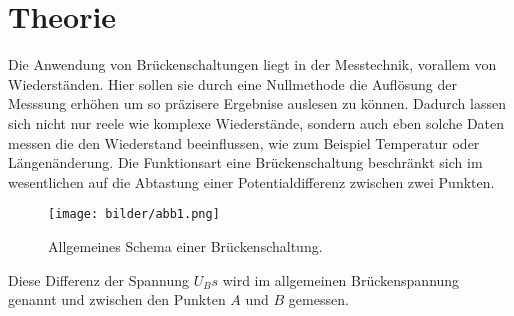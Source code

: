 \section{Theorie}
Die Anwendung von Brückenschaltungen liegt in der Messtechnik,  vorallem von Wiederständen. 
Hier sollen sie durch eine Nullmethode die Auflösung der Messsung erhöhen um so präzisere Ergebnise
auslesen zu können. Dadurch lassen sich nicht nur reele wie komplexe Wiederstände, sondern auch eben 
solche Daten messen die den Wiederstand beeinflussen, wie zum Beispiel Temperatur oder Längenänderung. %
Die Funktionsart eine Brückenschaltung beschränkt sich im wesentlichen auf die Abtastung einer 
Potentialdifferenz zwischen zwei Punkten. 
\begin{figure}
    \centering
    \texttt{[image: bilder/abb1.png]}
    \caption{Allgemeines Schema einer Brückenschaltung. \cite{skript}} 
    \label{fig:abb1}
\end{figure}
Diese Differenz der Spannung $U_Bs$ wird im allgemeinen Brückenspannung genannt und zwischen den Punkten $A$ und $B$ gemessen.
\\
\newline




